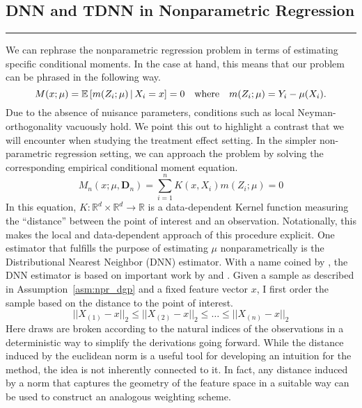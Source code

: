 \subsection{DNN and TDNN in Nonparametric Regression}
\hrule
We can rephrase the nonparametric regression problem in terms of estimating specific conditional moments.
In the case at hand, this means that our problem can be phrased in the following way.
\begin{equation}\label{CondMomEq}
	M(x; \mu)
	= \mathbb{E}\left[m(Z_{i}; \mu) \, | \, X_{i} = x\right]
	= 0
	\quad \text{where} \quad
	m(Z_{i}; \mu) = Y_{i} - \mu(X_{i}).
\end{equation}
Due to the absence of nuisance parameters, conditions such as local Neyman-orthogonality vacuously hold.
We point this out to highlight a contrast that we will encounter when studying the treatment effect setting.
In the simpler non-parametric regression setting, we can approach the problem by solving the corresponding empirical conditional moment equation.
\begin{equation}\label{EmpCondMomEq}
	M_n(x; \mu, \mathbf{D}_n)
	= \sum_{i = 1}^{n}K(x, X_{i})m(Z_{i}; \mu)
	= 0
\end{equation}
In this equation, $K:\mathbb{R}^d \times \mathbb{R}^d \rightarrow \mathbb{R}$ is a data-dependent Kernel function measuring the ``distance'' between the point of interest and an observation.
Notationally, this makes the local and data-dependent approach of this procedure explicit.
One estimator that fulfills the purpose of estimating $\mu$ nonparametrically is the Distributional Nearest Neighbor (DNN) estimator.
With a name coined by \citet{demirkaya_optimal_2024}, the DNN estimator is based on important work by \citet{steele_exact_2009} and \citet{biau_rate_2010}.
Given a sample as described in Assumption~\ref{asm:npr_dgp} and a fixed feature vector $x$, I first order the sample based on the distance to the point of interest.
\begin{equation}\label{eq:ordering}
	||X_{(1)} - x||_2
	\leq ||X_{(2)} - x||_2
	\leq \dotsc
	\leq ||X_{(n)} - x||_2
\end{equation}
Here draws are broken according to the natural indices of the observations in a deterministic way to simplify the derivations going forward.
While the distance induced by the euclidean norm is a useful tool for developing an intuition for the method, the idea is not inherently connected to it.
In fact, any distance induced by a norm that captures the geometry of the feature space in a suitable way can be used to construct an analogous weighting scheme.
